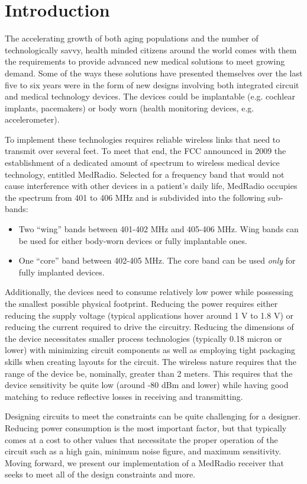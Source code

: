 \section{Introduction}
The accelerating growth of both aging populations and the number of technologically savvy, health minded citizens around the world comes with them the requirements to provide advanced new medical solutions to meet growing demand. Some of the ways these solutions have presented themselves over the last five to six years were in the form of new designs involving both integrated circuit and medical technology devices. The devices could be implantable (e.g. cochlear implants, pacemakers) or body worn (health monitoring devices, e.g. accelerometer). 

To implement these technologies requires reliable wireless links that need to transmit over several feet. To meet that end, the FCC announced in 2009 the establishment of a dedicated amount of spectrum to wireless medical device technology, entitled MedRadio. Selected for a frequency band that would not cause interference with other devices in a patient's daily life, MedRadio occupies the spectrum from 401 to 406 MHz and is subdivided into the following sub-bands:
\begin{itemize}
	\item Two ``wing'' bands between 401-402 MHz and 405-406 MHz. Wing bands can be used for either body-worn devices or fully implantable ones.
	\item One ``core'' band between 402-405 MHz. The core band can be used \emph{only} for fully implanted devices.
\end{itemize}

Additionally, the devices need to consume relatively low power while possessing the smallest possible physical footprint. Reducing the power requires either reducing the supply voltage (typical applications hover around 1 V to 1.8 V) or reducing the current required to drive the circuitry. Reducing the dimensions of the device necessitates smaller process technologies (typically 0.18 micron or lower) with minimizing circuit components as well as employing tight packaging skills when creating layouts for the circuit. The wireless nature requires that the range of the device be, nominally, greater than 2 meters. This requires that the device sensitivity be quite low (around -80 dBm and lower) while having good matching to reduce reflective losses in receiving and transmitting.

Designing circuits to meet the constraints can be quite challenging for a designer. Reducing power consumption is the most important factor, but that typically comes at a cost to other values that necessitate the proper operation of the circuit such as a high gain, minimum noise figure, and maximum sensitivity. Moving forward, we present our implementation of a MedRadio receiver that seeks to meet all of the design constraints and more.
